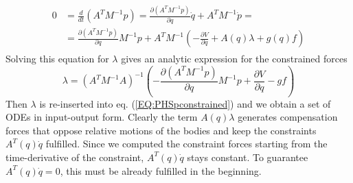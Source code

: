 \documentclass[a4paper,twoside, openright,12pt]{report}
\begin{document}
\begin{eqnarray}
\begin{aligned}
0 &= \frac{d}{dt}(A^TM^{-1}p) = \frac{\partial (A^TM^{-1}p)}{\partial q}\dot{q} + A^TM^{-1}\dot{p} = \\ &= \frac{\partial (A^TM^{-1}p)}{\partial q}M^{-1}p + A^TM^{-1}\left(-\frac{\partial V}{\partial q}+A(q)\lambda +g(q)f\right)
\end{aligned}
\end{eqnarray}
Solving this equation for $\lambda$ gives an analytic expression for the constrained forces
\begin{equation}
\lambda = (A^T M^{-1} A)^{-1} \left(-\frac{\partial (A^TM^{-1}p)}{\partial q}M^{-1}p + \frac{\partial V}{\partial q} - gf\right)
\end{equation}
Then $\lambda$ is re-inserted into eq. (\ref{EQ:PHSpconstrained}) and we obtain a set of ODEs in input-output form. Clearly the term $A(q)\lambda$ generates compensation forces that oppose relative motions of the bodies and keep the constraints $A^T(q)\dot{q}$ fulfilled. Since we computed the constraint forces starting from the time-derivative of the constraint, $A^T(q)\dot{q}$ stays constant. To guarantee $A^T(q)\dot{q}=0$, this must be already fulfilled in the beginning.
\end{document}
